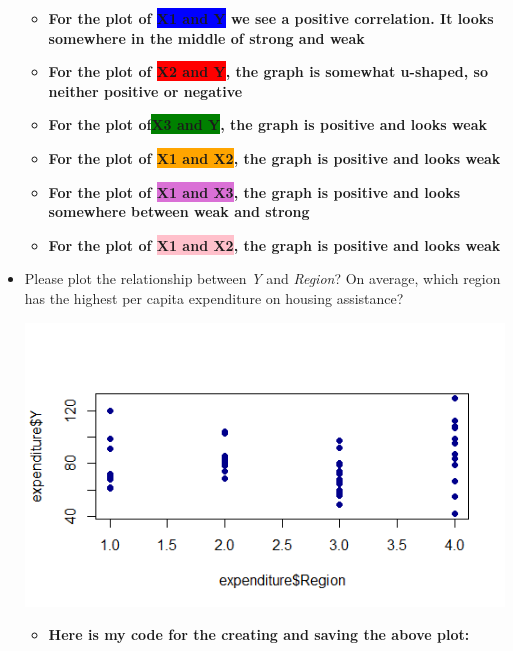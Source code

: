 \documentclass[12pt,letterpaper]{article}
\begin{document}
\begin{itemize}
\begin{itemize}
	\item \textbf{For the plot of \colorbox{blue}{X1 and Y} we see a positive correlation. It looks somewhere in the middle of strong and weak}
	
	\item \textbf{For the plot of \colorbox{red}{X2 and Y}, the graph is somewhat u-shaped, so neither positive or negative}
	
	\item \textbf{For the plot of\colorbox{green}{X3 and Y}, the graph is positive and looks weak}
	
	\item \textbf{For the plot of \colorbox{orange}{X1 and X2}, the graph is positive and looks weak}
	
	
	
	\item \textbf{For the plot of \colorbox{Orchid}{X1 and X3}, the graph is positive and looks somewhere between weak and strong}
	
	\item \textbf{For the plot of \colorbox{pink}{X1 and X2}, the graph is positive and looks weak}
\end{itemize}
	

\vspace{.5cm}
\item
Please plot the relationship between \emph{Y} and \emph{Region}? On average, which region has the highest per capita expenditure on housing assistance?
\vspace{0cm}


 \includegraphics[width=.8\textwidth]{Y_Region}\hfill
		


	\begin{itemize}
		
		\item \textbf{Here is my code for the creating and saving the above plot:}
		

\end{itemize}
\end{itemize}
\end{document}
